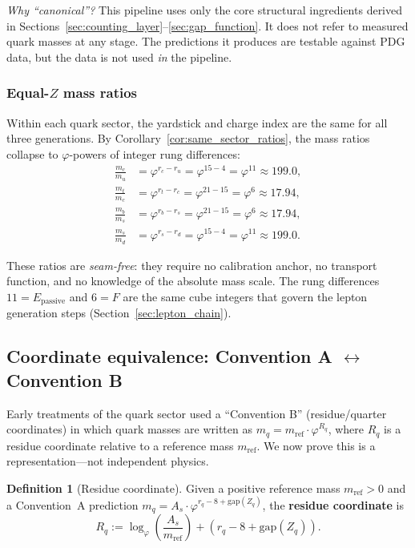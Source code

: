 \documentclass[11pt,a4paper]{article}
\theoremstyle{definition}
\newtheorem{definition}[theorem]{Definition}
\theoremstyle{remark}
\newcommand{\phig}{\varphi}
\newcommand{\Epass}{E_{\mathrm{passive}}}
\newcommand{\Zidx}{Z}
\begin{document}
\noindent\textit{Why ``canonical''?}\quad
This pipeline uses only the core structural ingredients derived in
Sections~\ref{sec:counting_layer}--\ref{sec:gap_function}.  It does not
refer to measured quark masses at any stage.  The predictions it produces
are testable against PDG data, but the data is not used \emph{in} the
pipeline.

\subsubsection{Equal-$\Zidx$ mass ratios}

Within each quark sector, the yardstick and charge index are the same
for all three generations.  By
Corollary~\ref{cor:same_sector_ratios}, the mass ratios collapse to
$\phig$-powers of integer rung differences:
\begin{align}
  \frac{m_c}{m_u} &= \phig^{r_c - r_u} = \phig^{15 - 4} = \phig^{11}
    \approx 199.0, \label{eq:charm_up} \\[3pt]
  \frac{m_t}{m_c} &= \phig^{r_t - r_c} = \phig^{21 - 15} = \phig^{6}
    \approx 17.94, \label{eq:top_charm} \\[3pt]
  \frac{m_b}{m_s} &= \phig^{r_b - r_s} = \phig^{21 - 15} = \phig^{6}
    \approx 17.94, \label{eq:bottom_strange} \\[3pt]
  \frac{m_s}{m_d} &= \phig^{r_s - r_d} = \phig^{15 - 4} = \phig^{11}
    \approx 199.0. \label{eq:strange_down}
\end{align}

\noindent
These ratios are \emph{seam-free}: they require no calibration anchor, no
transport function, and no knowledge of the absolute mass scale.  The rung
differences $11 = \Epass$ and $6 = F$ are the same cube integers that
govern the lepton generation steps (Section~\ref{sec:lepton_chain}).

\subsection{Coordinate equivalence: Convention A $\leftrightarrow$ Convention B}

Early treatments of the quark sector used a ``Convention B'' (residue/quarter
coordinates) in which quark masses are written as
$m_q = m_{\mathrm{ref}} \cdot \phig^{R_q}$, where $R_q$ is a residue
coordinate relative to a reference mass $m_{\mathrm{ref}}$.  We now prove
this is a representation---not independent physics.

\begin{definition}[Residue coordinate]
\label{def:residue_coord}
Given a positive reference mass $m_{\mathrm{ref}} > 0$ and a Convention~A
prediction $m_q = A_s \cdot \phig^{r_q - 8 + \mathrm{gap}(\Zidx_q)}$,
the \textbf{residue coordinate} is
\begin{equation}
  R_q := \log_\phig\!\left(\frac{A_s}{m_{\mathrm{ref}}}\right)
  + (r_q - 8 + \mathrm{gap}(\Zidx_q)).
  \label{eq:residue_coord}
\end{equation}
\end{definition}
\end{document}
